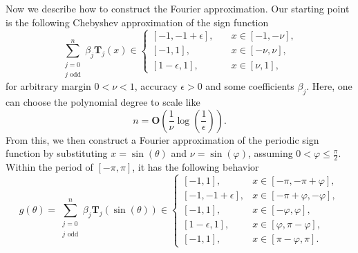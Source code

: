 \documentclass[letterpaper,onecolumn,11pt,accepted=2026-02-14]{quantumarticle}
\theoremstyle{remark}
\theoremstyle{plain}
\begin{document}
Now we describe how to construct the Fourier approximation. Our starting point is the following Chebyshev approximation of the sign function~\cite{Low2017USA,Wan22}
\begin{equation}
    \sum\limits_{\substack{j=0\\j\text{ odd}}}^{n}\beta_j\mathbf{T}_j(x)\in
    \begin{cases}
        [-1,-1+\epsilon],\quad&x\in[-1,-\nu],\\
        [-1,1],&x\in[-\nu,\nu],\\
        [1-\epsilon,1],&x\in[\nu,1],
    \end{cases}
\end{equation}
for arbitrary margin $0<\nu<1$, accuracy $\epsilon>0$ and some coefficients $\beta_j$. Here, one can choose the polynomial degree to scale like
\begin{equation}
\label{eq:sgn_degree}
    n=\mathbf{O}\left(\frac{1}{\nu}\log\left(\frac{1}{\epsilon}\right)\right).
\end{equation}
From this, we then construct a Fourier approximation of the periodic sign function by substituting $x=\sin(\theta)$ and $\nu=\sin(\varphi)$, assuming $0<\varphi\leq\frac{\pi}{2}$. Within the period of $[-\pi,\pi]$, it has the following behavior
\begin{equation}
    g(\theta)=\sum\limits_{\substack{j=0\\j\text{ odd}}}^{n}\beta_j\mathbf{T}_j(\sin(\theta))\in
    \begin{cases}
        [-1,1],\quad&x\in[-\pi,-\pi+\varphi],\\
        [-1,-1+\epsilon],&x\in[-\pi+\varphi,-\varphi],\\
        [-1,1],&x\in[-\varphi,\varphi],\\
        [1-\epsilon,1],&x\in[\varphi,\pi-\varphi],\\
        [-1,1],&x\in[\pi-\varphi,\pi].
    \end{cases}
\end{equation}
\end{document}
